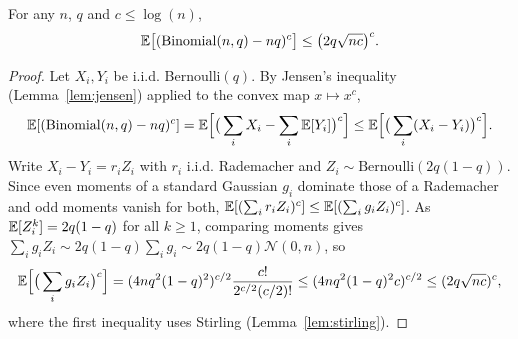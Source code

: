 \begin{proposition}
  \label{prop:binomial-moment}
  For any $n$, $q$ and $c \le \log(n)$,
  \[
    \mathbb{E}\big[(\mathrm{Binomial}(n,q) - nq)^c\big] \le \big(2q\sqrt{nc}\big)^c .
  \]
\end{proposition}
\begin{proof}
  Let $X_i, Y_i$ be i.i.d. Bernoulli$(q)$. By Jensen's inequality
  (Lemma~\ref{lem:jensen}) applied to the convex map $x \mapsto x^c$,
  \[
    \mathbb{E}[(\mathrm{Binomial}(n,q) - nq)^c]
      = \mathbb{E}\Big[\big(\sum_i X_i - \sum_i \mathbb{E}[Y_i]\big)^c\Big]
      \le \mathbb{E}\Big[\big(\sum_i (X_i - Y_i)\big)^c\Big].
  \]
  Write $X_i - Y_i = r_i Z_i$ with $r_i$ i.i.d. Rademacher and
  $Z_i \sim \mathrm{Bernoulli}(2q(1-q))$. Since even moments of a standard
  Gaussian $g_i$ dominate those of a Rademacher and odd moments vanish for both,
  $\mathbb{E}[(\sum_i r_i Z_i)^c] \le \mathbb{E}[(\sum_i g_i Z_i)^c]$. As
  $\mathbb{E}[Z_i^k] = 2q(1-q)$ for all $k \ge 1$, comparing moments gives
  $\sum_i g_i Z_i \sim 2q(1-q)\sum_i g_i \sim 2q(1-q)\mathcal{N}(0,n)$, so
  \[
    \mathbb{E}\Big[\big(\sum_i g_i Z_i\big)^c\Big]
      = (4nq^2(1-q)^2)^{c/2}\frac{c!}{2^{c/2}(c/2)!}
      \le (4nq^2(1-q)^2 c)^{c/2}
      \le (2q\sqrt{nc})^c ,
  \]
  where the first inequality uses Stirling (Lemma~\ref{lem:stirling}).
\end{proof}

